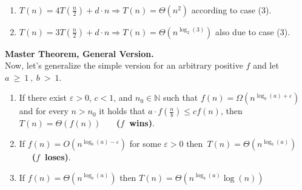 \begin{example}\
  \begin{enumerate}
    \item $ T(n)  =4T(\frac{n}{2})+d\cdot n \Rightarrow
      T(n) = \Theta(n^2)$ according to case (3).
    \item $T(n)  = 3T(\frac{n}{2}) + d\cdot n \Rightarrow T(n) = \Theta ( n^{\log_{2}(3)})$
      also due to case (3).
  \end{enumerate}
\end{example}
\begin{framed}\noindent \textbf{Master Theorem, General Version.}\\
Now, let's generalize the simple version for an arbitrary positive $f$ and let~$a~\ge~1~,~b~>~1$. 

\newcommand{\logab}{\log_{b} \left(a\right)}

\begin{enumerate}

    \item If there exist $\varepsilon >0$, $c<1$, and $n_0 \in \mathbb{N}$ such that $f\left(n\right) = \Omega \left( n^{\logab + \varepsilon }\right)$ and for every $n > n_0$ it holds that $a \cdot f\left( \frac{n}{b} \right) \le c f\left(n\right)$, then $T\left(n\right)=\Theta\left( f\left(n\right) \right)$ \ \ \ \textbf{($f$~wins)}.
    
    \item If  $f\left(n\right) = O \left( n^{\logab - \varepsilon }\right)$ for some $ \varepsilon > 0 $ then~$T\left(n\right)=\Theta\left( n^{\logab}\right)$ \ \ \ \textbf{($f$~loses)}.
    
    \item If  $f\left(n\right) = \Theta \left( n^{\logab} \right) $ then $T\left(n\right)=\Theta\left( n^{\logab}\log\left(n\right)\right)$
    
\end{enumerate}
\end{framed}
\newcommand{\TT}[2]{#1 T\left(\frac{n}{#2}\right)}

